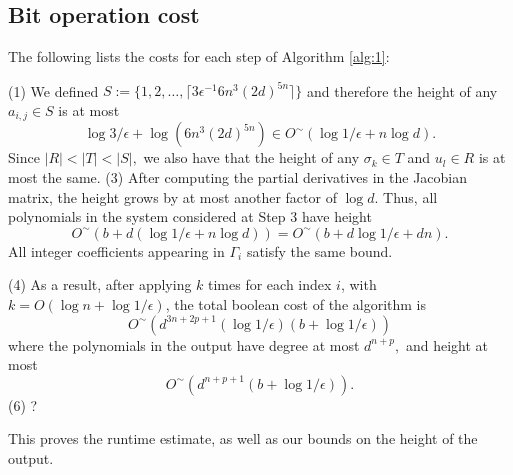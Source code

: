 \documentclass[12pt]{article}
\DeclareMathOperator{\grad}{grad}
\begin{document}
\subsection{Bit operation cost} 
%
The following lists the costs for each step of Algorithm \ref{alg:1}:

\noindent
    (1) We defined $S := \{1,2,\hdots,\lceil 3\epsilon^{-1}6n^3(2d)^{5n} \rceil \}$
      and therefore the height of any $a_{i,j} \in S$ is at most
    \[
    \log 3/{\epsilon} + \log(6n^3(2d)^{5n}) \in O^{\sim}(\log 1/{\epsilon} + n\log d).
    \]
Since $|R| < |T| < |S|,$ we also have that the height of any $\sigma_{k} \in T$ and $u_{l} \in R$ is at most the same.
\newline 
\noindent  
    (3)
    After computing the partial derivatives in the Jacobian matrix, the height grows by at
    most another factor of $\log d$. Thus, all polynomials in the
    system considered at Step 3 have height 
    \[
    O^{\sim}(b + d(\log 1 /
    \epsilon + n\log d))
    =
        O^{\sim}(b + d\log 1 /
    \epsilon + dn).
    \]
    All integer coefficients appearing in $\Gamma_i$ 
    satisfy the same bound.    
     
\noindent  
    (4)   
    As a result, after applying \cite[Algorithm 2]{SH} $k$ times
      for each index $i$, with $k = O(\log n + \log 1 / \epsilon)$,
      the total boolean cost of the algorithm is
  \[
O^{\sim}(d^{3n+2p+1}(\log1/\epsilon)(b + \log1/\epsilon))
  \]
      where the polynomials in the output have degree at most $d^{n+p},$ and height at most
  \[
O^{\sim}(d^{n+p+1}(b + \log1/\epsilon)).
  \]
  (6) ? 
  \par 
This proves the runtime estimate, as well as our bounds on the height
of the output.




\end{document}
